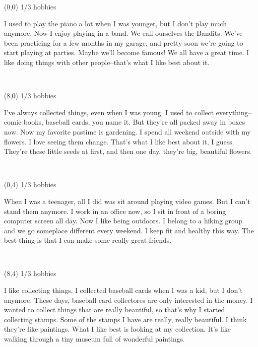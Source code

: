 \documentclass[a4paper]{article}
\newcommand{\mycard}[5]{%
	\vspace{0.1cm}
	\small #1 #2
	\par
	\parbox[t][6.7cm][c]{9.5cm}{%
	\hspace{0.1cm} \large#3 \\
	\normalsize#4 #5
	}
}
\begin{document}
\selectfont

\begin{textblock}{8}(0,0)
\mycard{1/3}{hobbies}{\parbox{9.0cm}{
I used to play the piano a lot when I was younger, but I don't play much anymore. Now I enjoy playing in a band. We call ourselves the Bandits. We've been practicing for a few months in my garage, and pretty soon we're going to start playing at parties. Maybe we'll become famous! We all have a great time. I like doing things with other people--that's what I like best about it.
}}{}{} 
\end{textblock}

\begin{textblock}{8}(8,0)
\mycard{1/3}{hobbies}{\parbox{9.0cm}{
I've always collected things, even when I was young. I used to collect everything--comic books, baseball cards, you name it. But they're all packed away in boxes now. Now my favorite pastime is gardening. I spend all weekend outside with my flowers. I love seeing them change. That's what I like best about it, I guess. They're these little seeds at first, and then one day, they're big, beautiful flowers.
}}{}{} 
\end{textblock}

\begin{textblock}{8}(0,4)
\mycard{1/3}{hobbies}{\parbox{9.0cm}{
When I was a teenager, all I did was sit around playing video games. But I can't stand them anymore. I work in an office now, so I sit in front of a boring computer screen all day. Now I like being outdoors. I belong to a hiking group and we go someplace different every weekend. I keep fit and healthy this way. The best thing is that I can make some really great friends.}}{}{} 
\end{textblock}

\begin{textblock}{8}(8,4)
\mycard{1/3}{hobbies}{\parbox{9.0cm}{
I like collecting things. I collected baseball cards when I was a kid, but I don't anymore. These days, baseball card collectores are only interested in the money. I wanted to collect things that are really beautiful, so that's why I started collecting stamps. Some of the stamps I have are really, really beautiful. I think they're like paintings. What I like best is looking at my collection. It's like walking through a tiny museum full of wonderful paintings.
}}{}{} 
\end{textblock}
\end{document}
